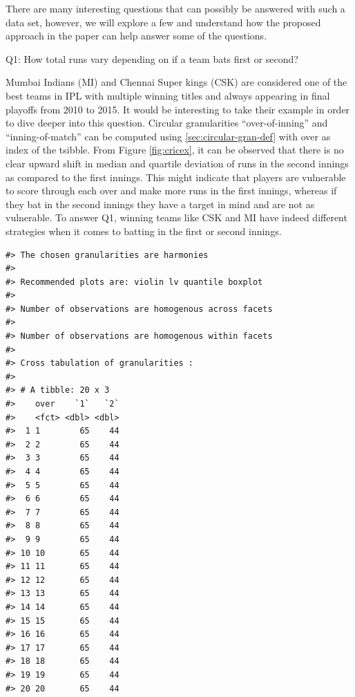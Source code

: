 \documentclass[12pt]{article}
\begin{document}
There are many interesting questions that can possibly be answered with such a data set, however, we will explore a few and understand how the proposed approach in the paper can help answer some of the questions.

Q1: How total runs vary depending on if a team bats first or second?

Mumbai Indians (MI) and Chennai Super kings (CSK) are considered one of the best teams in IPL with multiple winning titles and always appearing in final playoffs from 2010 to 2015. It would be interesting to take their example in order to dive deeper into this question. Circular granularities ``over-of-inning'' and ``inning-of-match'' can be computed using \ref{sec:circular-gran-def} with over as index of the tsibble. From Figure \ref{fig:cricex}, it can be observed that there is no clear upward shift in median and quartile deviation of runs in the second innings as compared to the first innings. This might indicate that players are vulnerable to score through each over and make more runs in the first innings, whereas if they bat in the second innings they have a target in mind and are not as vulnerable. To answer Q1, winning teams like CSK and MI have indeed different strategies when it comes to batting in the first or second innings.

\begin{verbatim}
#> The chosen granularities are harmonies 
#>  
#> Recommended plots are: violin lv quantile boxplot 
#>  
#> Number of observations are homogenous across facets 
#>  
#> Number of observations are homogenous within facets 
#>  
#> Cross tabulation of granularities : 
#>  
#> # A tibble: 20 x 3
#>    over    `1`   `2`
#>    <fct> <dbl> <dbl>
#>  1 1        65    44
#>  2 2        65    44
#>  3 3        65    44
#>  4 4        65    44
#>  5 5        65    44
#>  6 6        65    44
#>  7 7        65    44
#>  8 8        65    44
#>  9 9        65    44
#> 10 10       65    44
#> 11 11       65    44
#> 12 12       65    44
#> 13 13       65    44
#> 14 14       65    44
#> 15 15       65    44
#> 16 16       65    44
#> 17 17       65    44
#> 18 18       65    44
#> 19 19       65    44
#> 20 20       65    44
\end{verbatim}
\end{document}
